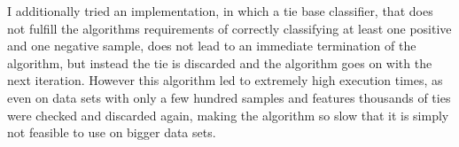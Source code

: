 I additionally tried an implementation, in which a tie base classifier, that does not fulfill the algorithms requirements
of correctly classifying at least one positive and one negative sample, does not lead to an immediate termination of the algorithm,
but instead the tie is discarded and the algorithm goes on with the next iteration.
However this algorithm led to extremely high execution times, as even on data sets with only a few hundred samples and features
thousands of ties were checked and discarded again, making the algorithm so slow that it is simply not feasible to use on bigger data sets.